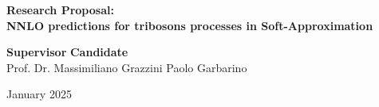 \begin{titlepage}
        \begin{center}
        {\Large
        \textbf{Research Proposal:}\\
        \vspace*{0.3cm}
        \textbf{NNLO predictions for tribosons processes in Soft-Approximation}}\\
        \vspace*{0.5cm}
        {\begin{minipage}{0.85\textwidth}
        \begin{flushleft}
        \textbf{Supervisor} \hfill \textbf{Candidate}\\
        Prof. Dr. Massimiliano Grazzini \hfill Paolo Garbarino\\
        \end{flushleft}
        \end{minipage}}
        \vspace*{1cm}
        \newline January 2025
        \end{center}
    \end{titlepage}